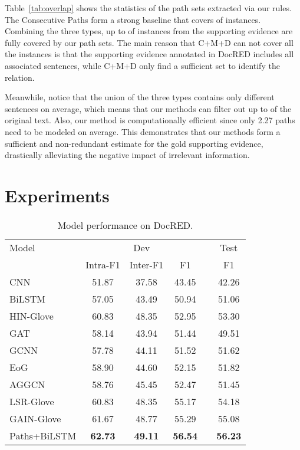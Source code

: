 \documentclass[11pt,a4paper]{article}
\begin{document}
Table~\ref{tab:overlap} shows the statistics of the path sets extracted via our rules. The Consecutive Paths form a strong baseline that covers  of instances. Combining the three types, up to  of instances from the supporting evidence are fully covered by our path sets. 
The main reason that C+M+D can not cover all the instances is that the supporting evidence annotated in DocRED includes all associated sentences, while C+M+D only find a sufficient set to identify the relation.


Meanwhile, notice that the union of the three types contains only  different sentences on average, which means that our methods can filter out up to  of the original text. Also, our method is computationally efficient since only 2.27 paths need to be modeled on average. This demonstrates that our methods form a sufficient and non-redundant estimate for the gold supporting evidence, drastically alleviating the negative impact of irrelevant information.



\section{Experiments}
\begin{table}[]
\setlength{\tabcolsep}{4pt}
\centering
\small
\begin{tabular}{lccclc}
\toprule
Model       & \multicolumn{3}{c}{Dev}     &  & Test  \\ \cmidrule{2-4} \cmidrule{6-6} 
            & Intra-F1 & Inter-F1 & F1    &  & F1    \\ \midrule
CNN         & 51.87    & 37.58    & 43.45 &  & 42.26 \\
BiLSTM      & 57.05    & 43.49    & 50.94 &  & 51.06 \\
HIN-Glove   & 60.83    & 48.35    & 52.95 &  & 53.30 \\ \midrule
GAT         & 58.14    & 43.94    & 51.44 &  & 49.51 \\ 
GCNN        & 57.78    & 44.11    & 51.52 &  & 51.62 \\
EoG         & 58.90    & 44.60    & 52.15 &  & 51.82 \\
AGGCN       & 58.76    & 45.45    & 52.47 &  & 51.45 \\
LSR-Glove   & 60.83    & 48.35    & 55.17 &  & 54.18 \\
GAIN-Glove  & 61.67    & 48.77    & 55.29 &  & 55.08 \\ \midrule
Paths+BiLSTM & \textbf{62.73}    & \textbf{49.11}    & \textbf{56.54} &  & \textbf{56.23} \\ \bottomrule
\end{tabular}
\caption{Model performance on DocRED.}
\label{tab:nn_res}
\vspace{-0.3cm}
\end{table}
\end{document}
